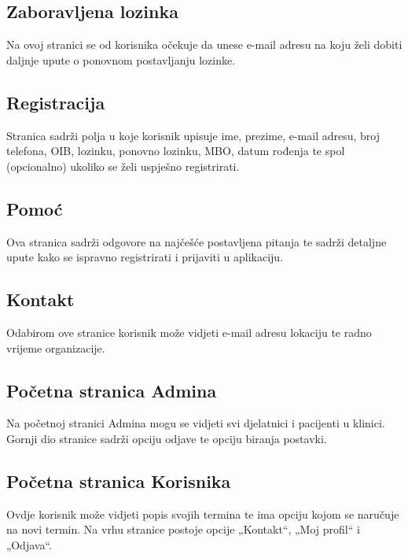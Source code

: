         \subsection{Zaboravljena lozinka}

        Na ovoj stranici se od korisnika očekuje da unese e-mail adresu na koju želi dobiti daljnje upute o ponovnom postavljanju lozinke.

        \subsection{Registracija}

        Stranica sadrži polja u koje korisnik upisuje ime, prezime, e-mail adresu, broj telefona, OIB, lozinku, ponovno lozinku, MBO, datum rođenja te spol (opcionalno) ukoliko se želi uspješno registrirati.

        \subsection{Pomoć}

        Ova stranica sadrži odgovore na najčešće postavljena pitanja te sadrži detaljne upute kako se ispravno registrirati i prijaviti u aplikaciju.

        \subsection{Kontakt}

        Odabirom ove stranice korisnik može vidjeti e-mail adresu lokaciju te radno vrijeme organizacije.

        \subsection{Početna stranica Admina}

        Na početnoj stranici Admina mogu se vidjeti svi djelatnici i pacijenti u klinici. Gornji dio stranice sadrži opciju odjave te opciju biranja postavki.

        \subsection{Početna stranica Korisnika}

        Ovdje korisnik može vidjeti popis svojih termina te ima opciju kojom se naručuje na novi termin. Na vrhu stranice postoje opcije „Kontakt“, „Moj profil“ i „Odjava“.

